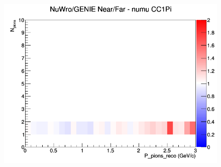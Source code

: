 \documentclass[12pt]{article}
\begin{document}
\begin{figure}[h]
\endminipage
{}
\includegraphics[width=\linewidth]{eff_N_P/LAr/pions/ratios/CC1Pi_NuWro_GENIE_numu_NF_N_P.png}
\endminipage
\newline
\end{figure}
\clearpage
\end{document}
